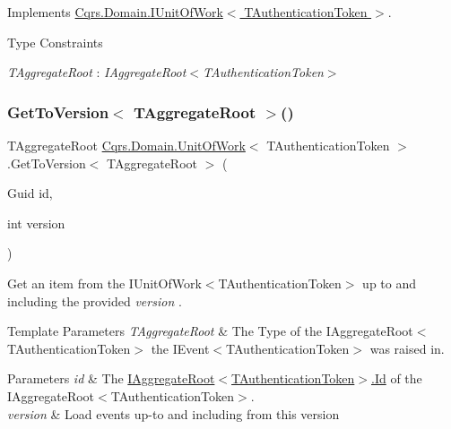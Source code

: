 Implements \hyperlink{interfaceCqrs_1_1Domain_1_1IUnitOfWork_a9878de7ddb925b1ef2193b8734d79a3a_a9878de7ddb925b1ef2193b8734d79a3a}{Cqrs.\+Domain.\+I\+Unit\+Of\+Work$<$ T\+Authentication\+Token $>$}.

\begin{Desc}
\item[Type Constraints]\begin{description}
\item[{\em T\+Aggregate\+Root} : {\em I\+Aggregate\+Root$<$T\+Authentication\+Token$>$}]\end{description}
\end{Desc}
\mbox{\label{classCqrs_1_1Domain_1_1UnitOfWork_ab5458f49a206e61b94aaaa4b1ac81911_ab5458f49a206e61b94aaaa4b1ac81911}} 
\subsubsection{\texorpdfstring{Get\+To\+Version$<$ T\+Aggregate\+Root $>$()}{GetToVersion< TAggregateRoot >()}}
{\footnotesize\ttfamily T\+Aggregate\+Root \hyperlink{classCqrs_1_1Domain_1_1UnitOfWork}{Cqrs.\+Domain.\+Unit\+Of\+Work}$<$ T\+Authentication\+Token $>$.Get\+To\+Version$<$ T\+Aggregate\+Root $>$ (\begin{DoxyParamCaption}\item[{Guid}]{id,  }\item[{int}]{version }\end{DoxyParamCaption})}



Get an item from the I\+Unit\+Of\+Work$<$\+T\+Authentication\+Token$>$ up to and including the provided {\itshape version} . 


\begin{DoxyTemplParams}{Template Parameters}
{\em T\+Aggregate\+Root} & The Type of the I\+Aggregate\+Root$<$\+T\+Authentication\+Token$>$ the I\+Event$<$\+T\+Authentication\+Token$>$ was raised in.\\
\hline
\end{DoxyTemplParams}

\begin{DoxyParams}{Parameters}
{\em id} & The \hyperlink{interfaceCqrs_1_1Domain_1_1IAggregateRoot_a04aa3198f1371afa345a58e8fcb713d7_a04aa3198f1371afa345a58e8fcb713d7}{I\+Aggregate\+Root$<$\+T\+Authentication\+Token$>$.\+Id} of the I\+Aggregate\+Root$<$\+T\+Authentication\+Token$>$.\\
\hline
{\em version} & Load events up-\/to and including from this version\\
\hline
\end{DoxyParams}


